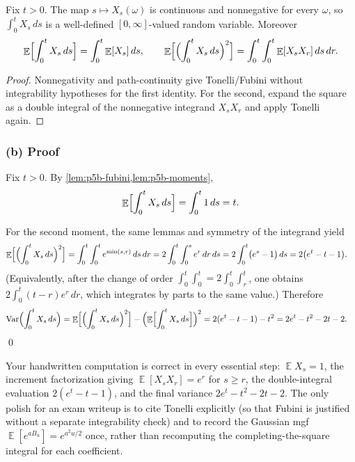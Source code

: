 \documentclass[11pt,a4paper]{article}
\DeclareMathOperator{\Var}{Var}
\DeclareMathOperator{\E}{\mathbb{E}}
\begin{document}
\begin{lemma}
\label{lem:p5b-fubini}
Fix \(t>0\). The map \(s\mapsto X_s(\omega)\) is continuous and nonnegative for every \(\omega\), so \(\int_0^t X_s\,ds\) is a well-defined \([0,\infty]\)-valued random variable. Moreover
\[
\E\Bigl[\int_0^t X_s\,ds\Bigr]
=
\int_0^t \E[X_s]\,ds,
\qquad
\E\Bigl[\Bigl(\int_0^t X_s\,ds\Bigr)^2\Bigr]
=
\int_0^t\int_0^t \E[X_s X_r]\,ds\,dr.
\]
\end{lemma}

\begin{proof}
Nonnegativity and path-continuity give Tonelli/Fubini without integrability hypotheses for the first identity. For the second, expand the square as a double integral of the nonnegative integrand \(X_s X_r\) and apply Tonelli again.
\end{proof}

\subsubsection{(b) Proof}

Fix \(t>0\). By \cref{lem:p5b-fubini,lem:p5b-moments},
\[
\E\Bigl[\int_0^t X_s\,ds\Bigr]
=
\int_0^t 1\,ds
=
t.
\]

For the second moment, the same lemmas and symmetry of the integrand yield
\begin{align*}
\E\Bigl[\Bigl(\int_0^t X_s\,ds\Bigr)^2\Bigr]
&=
\int_0^t\int_0^t e^{\min(s,r)}\,ds\,dr
=
2\int_0^t\int_0^s e^{r}\,dr\,ds
=
2\int_0^t\bigl(e^{s}-1\bigr)\,ds
=
2\bigl(e^{t}-t-1\bigr).
\end{align*}
(Equivalently, after the change of order \(\int_0^t\int_0^t=2\int_0^t\int_r^t\), one obtains \(2\int_0^t(t-r)e^{r}\,dr\), which integrates by parts to the same value.) Therefore
\begin{align*}
\Var\Bigl(\int_0^t X_s\,ds\Bigr)
&=
\E\Bigl[\Bigl(\int_0^t X_s\,ds\Bigr)^2\Bigr]
-
\Bigl(\E\Bigl[\int_0^t X_s\,ds\Bigr]\Bigr)^2
=
2(e^{t}-t-1)-t^2
=
2e^{t}-t^2-2t-2.
\end{align*}
\qed

\begin{remark*}
Your handwritten computation is correct in every essential step: \(\E X_s=1\), the increment factorization giving \(\E[X_s X_r]=e^{r}\) for \(s\ge r\), the double-integral evaluation \(2(e^{t}-t-1)\), and the final variance \(2e^{t}-t^{2}-2t-2\). The only polish for an exam writeup is to cite Tonelli explicitly (so that Fubini is justified without a separate integrability check) and to record the Gaussian mgf \(\E[e^{aB_u}]=e^{a^{2}u/2}\) once, rather than recomputing the completing-the-square integral for each coefficient.
\end{remark*}
\end{document}
